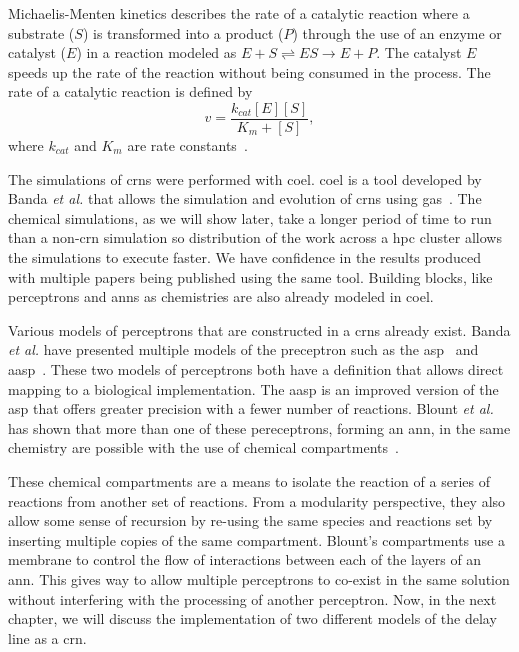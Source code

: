 Michaelis-Menten kinetics describes the rate of a catalytic reaction where a substrate ($S$) is transformed into a product ($P$) through the use of an enzyme or catalyst ($E$) in a reaction modeled as $E + S \rightleftharpoons ES \rightarrow E + P$. The catalyst $E$ speeds up the rate of the reaction without being consumed in the process. The rate of a catalytic reaction is defined by
\begin{equation}
v = \frac{k_{cat}[E][S]}{K_m+[S]},
\end{equation}
where $k_{cat}$ and $K_m$ are rate constants~\cite{Copeland2004-sq}.

The simulations of \glspl{crn} were performed with \acrfull{coel}. \Gls{coel} is a tool developed by Banda \textit{et al.} that allows the simulation and evolution of \glspl{crn} using \glspl{ga}~\cite{Banda2014-qw}. The chemical simulations, as we will show later, take a longer period of time to run than a non-\gls{crn} simulation so distribution of the work across a \gls{hpc} cluster allows the simulations to execute faster. We have confidence in the results produced with multiple papers being published using the same tool. Building blocks, like perceptrons and \glspl{ann} as chemistries are also already modeled in \gls{coel}.

Various models of perceptrons that are constructed in a \glspl{crn} already exist. Banda \textit{et al.} have presented multiple models of the preceptron such as the \gls{asp}~\cite{Banda2014-bp} and \gls{aasp}~\cite{Banda2014-kg}. These two models of perceptrons both have a definition that allows direct mapping to a biological implementation. The \gls{aasp} is an improved version of the \gls{asp} that offers greater precision with a fewer number of reactions. Blount \textit{et al.} has shown that more than one of these pereceptrons, forming an \gls{ann}, in the same chemistry are possible with the use of chemical compartments~\cite{Blount_undated-ro}.

These chemical compartments are a means to isolate the reaction of a series of reactions from another set of reactions. From a modularity perspective, they also allow some sense of recursion by re-using the same species and reactions set by inserting multiple copies of the same compartment. Blount's compartments use a membrane to control the flow of interactions between each of the layers of an \gls{ann}. This gives way to allow multiple perceptrons to co-exist in the same solution without interfering with the processing of another perceptron. Now, in the next chapter, we will discuss the implementation of two different models of the delay line as a \gls{crn}.

